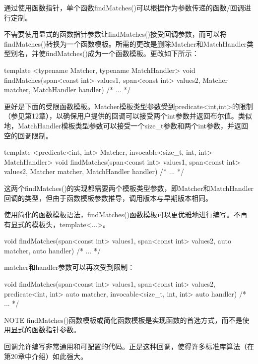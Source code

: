 通过使用函数指针，单个函数findMatches()可以根据作为参数传递的函数/回调进行定制。


不需要使用显式的函数指针参数让findMatches()接受回调参数，而可以将findMatches()转换为一个函数模板。所需的更改是删除Matcher和MatchHandler类型别名，并使findMatches()成为一个函数模板。更改如下所示：

\begin{cpp}
template <typename Matcher, typename MatchHandler>
void findMatches(span<const int> values1, span<const int> values2,
    Matcher matcher, MatchHandler handler)
{ /* ... */ }
\end{cpp}

更好是下面的受限函数模板。Matcher模板类型参数受到predicate<int,int>的限制（参见第12章），以确保用户提供的回调可以接受两个int参数并返回布尔值。类似地，MatchHandler模板类型参数可以接受一个size\_t参数和两个int参数，并返回空的回调限制。

\begin{cpp}
template <predicate<int, int> Matcher, invocable<size_t, int, int> MatchHandler>
void findMatches(span<const int> values1, span<const int> values2,
    Matcher matcher, MatchHandler handler)
{ /* ... */ }
\end{cpp}

这两个findMatches()的实现都需要两个模板类型参数，即Matcher和MatchHandler回调的类型，但由于函数模板参数推导，调用版本与早期版本相同。

使用简化的函数模板语法，findMatches()函数模板可以更优雅地进行编写。不再有显式的模板头，template<...>。

\begin{cpp}
void findMatches(span<const int> values1, span<const int> values2,
    auto matcher, auto handler)
{ /* ... */ }
\end{cpp}

matcher和handler参数可以再次受到限制：

\begin{cpp}
void findMatches(span<const int> values1, span<const int> values2,
    predicate<int, int> auto matcher, invocable<size_t, int, int> auto handler)
{ /* ... */ }
\end{cpp}

\begin{myNotic}{NOTE}
findMatches()函数模板或简化函数模板是实现函数的首选方式，而不是使用显式的函数指针参数。
\end{myNotic}

回调允许编写非常通用和可配置的代码。正是这种回调，使得许多标准库算法（在第20章中介绍）如此强大。

